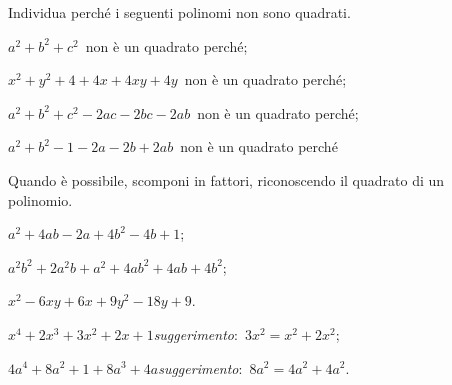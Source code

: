 \begin{esercizio}
Individua perché i seguenti polinomi non sono quadrati.
\label{ese:13.48}
\begin{enumeratea}
 \item $a^{2}+b^{2}+c^{2}$\, non è un quadrato perché\dotfill;
 \item $x^{2}+y^{2}+4+4x+4xy+4y$\, non è un quadrato perché\dotfill;
 \item $a^{2}+b^{2}+c^{2}-2ac-2bc-2ab$\, non è un quadrato perché\dotfill;
 \item $a^{2}+b^{2}-1-2a-2b+2ab$\, non è un quadrato perché\dotfill
\end{enumeratea}
\end{esercizio}

\begin{esercizio}[\Ast]
\label{ese:13.49}
Quando è possibile, scomponi in fattori, riconoscendo il quadrato di un polinomio.
\begin{enumeratea}
 \item $a^{2}+4ab-2a+4b^{2}-4b+1$;
 \item $a^{2}b^{2}+2a^{2}b+a^{2}+4ab^{2}+4ab+4b^{2}$;
 \item $x^{2}-6xy+6x+9y^{2}-18y+9$.
 \item $x^{4}+2x^{3}+3x^{2}+2x+1$\quad  \emph{suggerimento}:~$3x^{2}=x^{2}+2x^{2}$;
 \item $4a^{4}+8a^{2}+1+8a^{3}+4a$\quad \emph{suggerimento}:~$8a^{2}=4a^{2}+4a^{2}$.
\end{enumeratea}
\end{esercizio}

